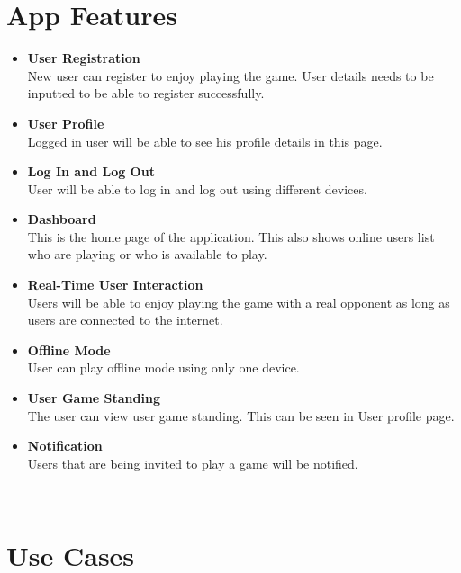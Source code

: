 \documentclass{article}
\begin{document}
\section{App Features}
    \begin{itemize}
    	\item \textbf{User Registration}\\
    	New user can register to enjoy playing the game.  User details needs to be inputted to be able to register successfully.
    	\item \textbf{User Profile}\\
    	Logged in user will be able to see his profile details in this page.
    	\item \textbf{Log In and Log Out}\\
    	User will be able to log in and log out using different devices.
    	\item \textbf{Dashboard}\\
    	This is the home page of the application.  This also shows online users list who are playing or who is available to play.
    	\item \textbf{Real-Time User Interaction}\\
    	Users will be able to enjoy playing the game with a real opponent as long as users are connected to the internet.
    	\item \textbf{Offline Mode}\\ 
    	User can play offline mode using only one device.
    	\item \textbf{User Game Standing}\\
    	The user can view user game standing.  This can be seen in User profile page.
    	\item \textbf{Notification}\\
    	Users that are being invited to play a game will be notified.
    \end{itemize}
    ~\newline

\section{Use Cases}
\end{document}
